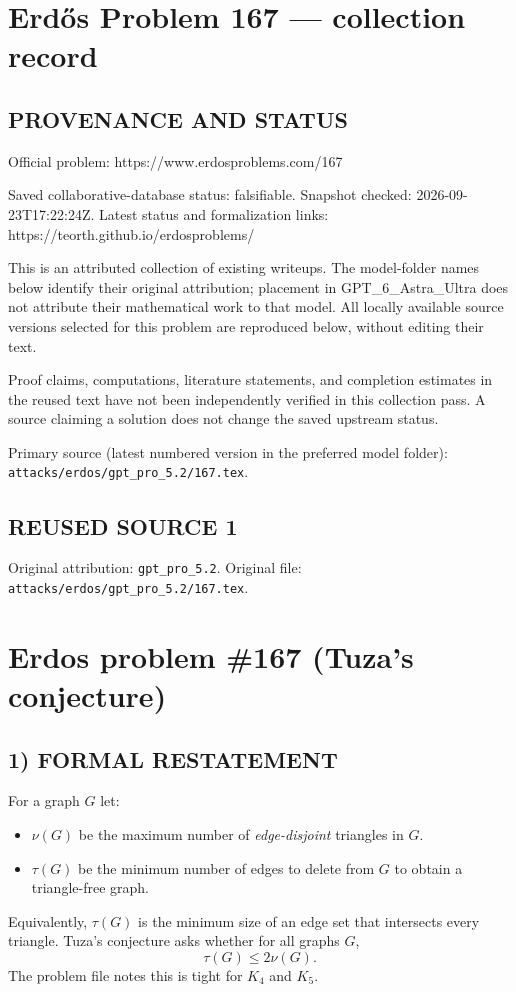 \section*{Erd\H{o}s Problem 167 --- collection record}

\subsection*{PROVENANCE AND STATUS}
Official problem: https://www.erdosproblems.com/167

Saved collaborative-database status: falsifiable.
Snapshot checked: 2026-09-23T17:22:24Z.
Latest status and formalization links: https://teorth.github.io/erdosproblems/

This is an attributed collection of existing writeups. The model-folder names below identify their original attribution; placement in GPT\_6\_Astra\_Ultra does not attribute their mathematical work to that model. All locally available source versions selected for this problem are reproduced below, without editing their text.

Proof claims, computations, literature statements, and completion estimates in the reused text have not been independently verified in this collection pass. A source claiming a solution does not change the saved upstream status.

Primary source (latest numbered version in the preferred model folder): \texttt{attacks/erdos/gpt\_pro\_5.2/167.tex}.

\subsection*{REUSED SOURCE 1}
Original attribution: \texttt{gpt\_pro\_5.2}.
Original file: \texttt{attacks/erdos/gpt\_pro\_5.2/167.tex}.

\section*{Erdos problem \#167 (Tuza's conjecture)}

\subsection*{1) FORMAL RESTATEMENT}
For a graph $G$ let:
\begin{itemize}
\item $\nu(G)$ be the maximum number of \emph{edge-disjoint} triangles in $G$.
\item $\tau(G)$ be the minimum number of edges to delete from $G$ to obtain a triangle-free graph.
\end{itemize}
Equivalently, $\tau(G)$ is the minimum size of an edge set that intersects every triangle.
Tuza's conjecture asks whether for all graphs $G$,
\[
\tau(G)\le 2\nu(G).
\]
The problem file notes this is tight for $K_4$ and $K_5$.

